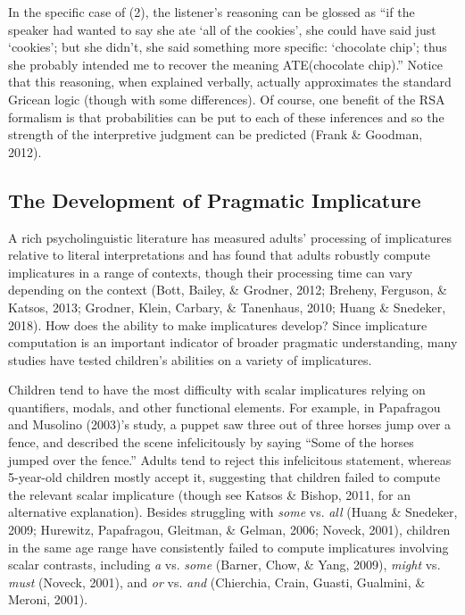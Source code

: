 \documentclass[man]{apa6}
\begin{document}
In the specific case of (2), the listener's reasoning can be glossed as
\enquote{if the speaker had wanted to say she ate \enquote{all of the
cookies}, she could have said just \enquote{cookies}; but she didn't,
she said something more specific: \enquote{chocolate chip}; thus she
probably intended me to recover the meaning ATE(chocolate chip).} Notice
that this reasoning, when explained verbally, actually approximates the
standard Gricean logic (though with some differences). Of course, one
benefit of the RSA formalism is that probabilities can be put to each of
these inferences and so the strength of the interpretive judgment can be
predicted (Frank \& Goodman, 2012).

\subsection{The Development of Pragmatic
Implicature}\label{the-development-of-pragmatic-implicature}

A rich psycholinguistic literature has measured adults' processing of
implicatures relative to literal interpretations and has found that
adults robustly compute implicatures in a range of contexts, though
their processing time can vary depending on the context (Bott, Bailey,
\& Grodner, 2012; Breheny, Ferguson, \& Katsos, 2013; Grodner, Klein,
Carbary, \& Tanenhaus, 2010; Huang \& Snedeker, 2018). How does the
ability to make implicatures develop? Since implicature computation is
an important indicator of broader pragmatic understanding, many studies
have tested children's abilities on a variety of implicatures.

Children tend to have the most difficulty with scalar implicatures
relying on quantifiers, modals, and other functional elements. For
example, in Papafragou and Musolino (2003)'s study, a puppet saw three
out of three horses jump over a fence, and described the scene
infelicitously by saying \enquote{Some of the horses jumped over the
fence.} Adults tend to reject this infelicitous statement, whereas
5-year-old children mostly accept it, suggesting that children failed to
compute the relevant scalar implicature (though see Katsos \& Bishop,
2011, for an alternative explanation). Besides struggling with
\emph{some} vs. \emph{all} (Huang \& Snedeker, 2009; Hurewitz,
Papafragou, Gleitman, \& Gelman, 2006; Noveck, 2001), children in the
same age range have consistently failed to compute implicatures
involving scalar contrasts, including \emph{a} vs. \emph{some} (Barner,
Chow, \& Yang, 2009), \emph{might} vs. \emph{must} (Noveck, 2001), and
\emph{or} vs. \emph{and} (Chierchia, Crain, Guasti, Gualmini, \& Meroni,
2001).
\end{document}
